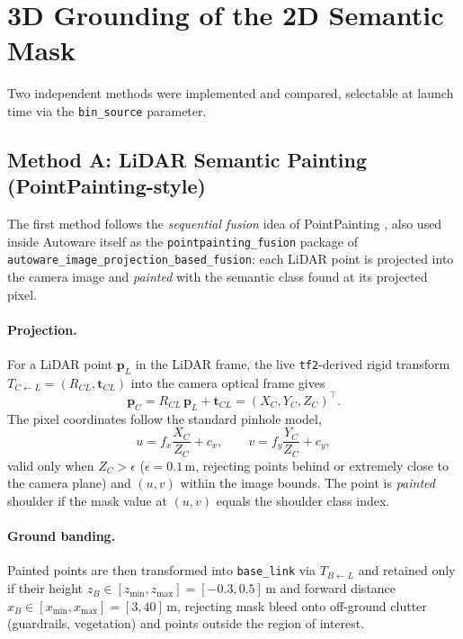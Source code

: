 \documentclass[11pt]{article}
\newcommand{\code}[1]{\texttt{#1}}
\begin{document}
\section{3D Grounding of the 2D Semantic Mask}
\label{sec:grounding}

Two independent methods were implemented and compared, selectable at launch time via the
\code{bin\_source} parameter.

\subsection{Method A: LiDAR Semantic Painting (PointPainting-style)}
\label{sec:pointpainting}

The first method follows the \emph{sequential fusion} idea of PointPainting
\citep{vora2020pointpainting}, also used inside Autoware itself as the
\code{pointpainting\_fusion} package of \code{autoware\_image\_projection\_based\_fusion}: each
LiDAR point is projected into the camera image and \emph{painted} with the semantic class found
at its projected pixel.

\paragraph{Projection.} For a LiDAR point $\mathbf{p}_{L}$ in the LiDAR frame, the live
\code{tf2}-derived rigid transform $T_{C \leftarrow L} = (R_{CL}, \mathbf{t}_{CL})$ into the camera
optical frame gives
\begin{equation}
\mathbf{p}_C = R_{CL}\,\mathbf{p}_L + \mathbf{t}_{CL} = (X_C, Y_C, Z_C)^\top .
\end{equation}
The pixel coordinates follow the standard pinhole model,
\begin{equation}
u = f_x \frac{X_C}{Z_C} + c_x, \qquad
v = f_y \frac{Y_C}{Z_C} + c_y,
\label{eq:pinhole}
\end{equation}
valid only when $Z_C > \epsilon$ ($\epsilon{=}0.1\,\mathrm{m}$, rejecting points behind or
extremely close to the camera plane) and $(u,v)$ within the image bounds. The point is
\emph{painted} shoulder if the mask value at $(u,v)$ equals the shoulder class index.

\paragraph{Ground banding.} Painted points are then transformed into \code{base\_link} via
$T_{B \leftarrow L}$ and retained only if their height $z_B \in [z_{\min}, z_{\max}] =
[-0.3, 0.5]\,\mathrm{m}$ and forward distance $x_B \in [x_{\min}, x_{\max}] = [3, 40]\,\mathrm{m}$,
rejecting mask bleed onto off-ground clutter (guardrails, vegetation) and points outside the
region of interest.
\end{document}
